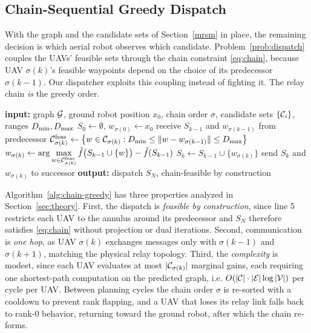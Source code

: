 \subsection{Chain-Sequential Greedy Dispatch}
\label{sec:chain-greedy}

With the graph and the candidate sets of Section~\ref{mrsm} in place, the remaining decision is which aerial robot observes which candidate. Problem~\ref{prob:dispatch} couples the UAVs' feasible sets through the chain constraint \eqref{eq:chain}, because UAV $\sigma(k)$'s feasible waypoints depend on the choice of its predecessor $\sigma(k-1)$. Our dispatcher exploits this coupling instead of fighting it. The relay chain \emph{is} the greedy order.

\begin{algorithm}[t]
\caption{Chain-Sequential Greedy Dispatch for One Planning Cycle}
\label{alg:chain-greedy}
\begin{algorithmic}[1]
\STATE \textbf{input:} graph $\mathcal{G}$, ground robot position $x_0$, chain order $\sigma$, candidate sets $\{\mathcal{C}_i\}$, ranges $D_{\min}, D_{\max}$
\STATE $S_0 \gets \emptyset$, $w_{\sigma(0)} \gets x_0$
  \STATE receive $S_{k-1}$ and $w_{\sigma(k-1)}$ from predecessor
  \STATE $\mathcal{C}_{\sigma(k)}^{\mathrm{feas}} \gets \bigl\{ w \in \mathcal{C}_{\sigma(k)} : D_{\min} \leq \| w - w_{\sigma(k-1)} \| \leq D_{\max} \bigr\}$
  \STATE $w_{\sigma(k)} \gets \displaystyle \arg\max_{w \in \mathcal{C}_{\sigma(k)}^{\mathrm{feas}}} \tilde f\bigl(S_{k-1} \cup \{w\}\bigr) - \tilde f(S_{k-1})$
  \STATE $S_k \gets S_{k-1} \cup \{ w_{\sigma(k)} \}$
  \STATE send $S_k$ and $w_{\sigma(k)}$ to successor
\ENDFOR
\STATE \textbf{output:} dispatch $S_N$, chain-feasible by construction
\end{algorithmic}
\end{algorithm}

Algorithm~\ref{alg:chain-greedy} has three properties analyzed in Section~\ref{sec:theory}. First, the dispatch is \emph{feasible by construction}, since line 5 restricts each UAV to the annulus around its predecessor and $S_N$ therefore satisfies \eqref{eq:chain} without projection or dual iterations. Second, communication is \emph{one hop}, as UAV $\sigma(k)$ exchanges messages only with $\sigma(k-1)$ and $\sigma(k+1)$, matching the physical relay topology. Third, the \emph{complexity} is modest, since each UAV evaluates at most $|\mathcal{C}_{\sigma(k)}|$ marginal gains, each requiring one shortest-path computation on the predicted graph, i.e. $O(|\mathcal{C}| \cdot |\mathcal{E}| \log |\mathcal{V}|)$ per cycle per UAV. Between planning cycles the chain order $\sigma$ is re-sorted with a cooldown to prevent rank flapping, and a UAV that loses its relay link falls back to rank-0 behavior, returning toward the ground robot, after which the chain re-forms.

